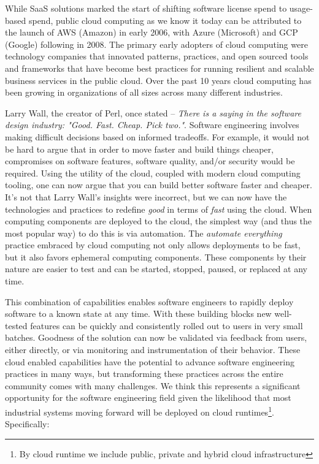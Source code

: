 \documentclass[conference]{IEEEtran}
\begin{document}
While SaaS solutions marked the start of shifting software license spend to usage-based spend, public cloud computing as we know it today can be attributed to the launch of AWS (Amazon) \cite{AWSLaunch} in early 2006, with Azure (Microsoft)\cite{AzureLaunch} and GCP (Google)\cite{GCPLaunch} following in 2008. The primary early adopters of cloud computing were technology companies that innovated patterns, practices, and open sourced tools and frameworks that have become best practices for running resilient and scalable business services in the public cloud.  Over the past 10 years cloud computing has been growing in organizations of all sizes across many different industries. 

Larry Wall, the creator of Perl, once stated -- \textit{There is a saying in the software design industry: "Good. Fast. Cheap. Pick two."}.  Software engineering involves making difficult decisions based on informed tradeoffs.  For example, it would not be hard to argue that in order to move faster and build things cheaper, compromises on software features, software quality, and/or security would be required. Using the utility of the cloud, coupled with modern cloud computing tooling, one can now argue that you can build better software faster and cheaper.  It's not that Larry Wall's insights were incorrect, but we can now have the technologies and practices to redefine \textit{good} in terms of \textit{fast} using the cloud.  When computing components are deployed to the cloud, the simplest way (and thus the most popular way) to do this is via automation\cite{terraform, AWSCloudFormation, AzureLaunch, Pulumi}.  The \textit{automate everything} practice embraced by cloud computing not only allows deployments to be fast, but it also favors ephemeral computing components. These components by their nature are easier to test\cite{kim2016devops} and can be started, stopped, paused, or replaced at any time. 

This combination of capabilities enables software engineers to rapidly deploy software to a known state at any time. With these building blocks new well-tested features can be quickly and consistently rolled out to users in very small batches.  Goodness of the solution can now be validated via feedback from users, either directly, or via monitoring and instrumentation of their behavior.  These cloud enabled capabilities have the potential to advance software engineering practices in many ways, but transforming these practices across the entire community comes with many challenges. We think this represents a significant opportunity for the software engineering field given the likelihood that most industrial systems moving forward will be deployed on cloud runtimes\footnote{By cloud runtime we include public, private and hybrid cloud infrastructure}. Specifically:
\end{document}
